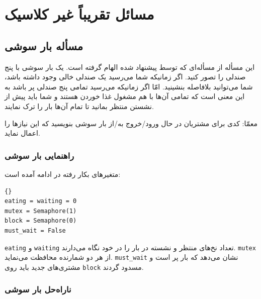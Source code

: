 \documentclass{book}
\newcommand{\clearemptydoublepage}{}%
\begin{document}
\chapter{مسائل تقریباً غیر کلاسیک}

\section{مسأله بار سوشی}

    این مسأله از مسأله‌ای که توسط  پیشنهاد شده الهام گرفته است\cite{reek}. یک بار سوشی با پنج صندلی را  تصور کنید.
    اگر زمانیکه شما می‌رسید یک صندلی خالی وجود داشته باشد، شما می‌توانید بلافاصله بنشینید. امّا اگر زمانیکه می‌رسید تمامی پنج صندلی پر باشد 
    به این معنی است که تمامی آن‌ها با هم مشغول غذا خوردن هستند و شما باید پیش از نشستن منتظر بمانید تا تمام آن‌ها بار را ترک نمایند. 
    
    معمّا: کدی برای مشتریان در حال ورود/خروج  به/از بار سوشی بنویسید که این نیازها را اعمال نماید. 

\clearemptydoublepage
\subsection{راهنمایی بار سوشی}

    متغیرهای بکار رفته در ادامه آمده است:

\begin{latin}
\begin{lstlisting}[title=\rl{راهنمایی بار سوشی}]{}
eating = waiting = 0
mutex = Semaphore(1)
block = Semaphore(0)
must_wait = False
\end{lstlisting}
\end{latin}



    {\tt eating} و {\tt waiting}
    تعداد نخ‌های منتظر و نشسته در بار را در خود نگاه می‌دارند. {\tt mutex}  از هر دو شمارنده محافظت می‌نماید.  {\tt must\_wait}
    نشان می‌دهد که بار پر است و مشتری‌های جدید باید روی  {\tt block} مسدود گردند. 
    

\clearemptydoublepage
\subsection{ناراه‌حل بار سوشی}
\end{document}

